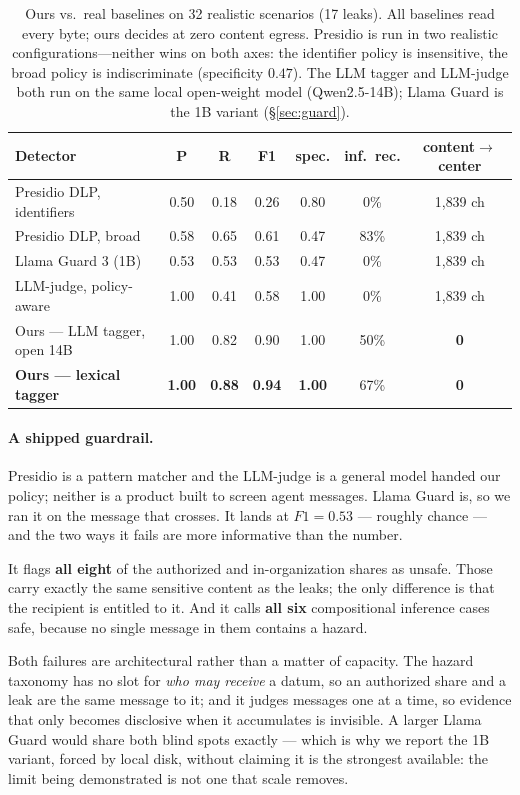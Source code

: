 \documentclass[sigconf,anonymous,review]{acmart}
\theoremstyle{acmplain}
\begin{document}
\begin{table}[t]\centering\small
\begin{tabular}{lcccccc}
\toprule
Detector & P & R & F1 & spec. & inf.\ rec. & content$\to$center \\
\midrule
Presidio DLP, identifiers & 0.50 & 0.18 & 0.26 & 0.80 & 0\% & 1{,}839 ch \\
Presidio DLP, broad & 0.58 & 0.65 & 0.61 & 0.47 & 83\% & 1{,}839 ch \\
Llama Guard 3 (1B) & 0.53 & 0.53 & 0.53 & 0.47 & 0\% & 1{,}839 ch \\
LLM-judge, policy-aware & 1.00 & 0.41 & 0.58 & 1.00 & 0\% & 1{,}839 ch \\
Ours --- LLM tagger, open 14B & 1.00 & 0.82 & 0.90 & 1.00 & 50\% & \textbf{0} \\
\textbf{Ours --- lexical tagger} & \textbf{1.00} & \textbf{0.88} & \textbf{0.94} & \textbf{1.00} & 67\% & \textbf{0} \\
\bottomrule
\end{tabular}
\caption{Ours vs.\ real baselines on 32 realistic scenarios (17 leaks). All baselines
read every byte; ours decides at zero content egress. Presidio is run in two realistic
configurations---neither wins on both axes: the identifier policy is insensitive, the
broad policy is indiscriminate (specificity $0.47$). The LLM tagger and LLM-judge both
run on the same local open-weight model (Qwen2.5-14B); Llama Guard is the 1B variant
(\S\ref{sec:guard}).}
\label{tab:frontier}
\end{table}

\paragraph{A shipped guardrail.} Presidio is a pattern matcher and the LLM-judge is
a general model handed our policy; neither is a product built to screen agent
messages. Llama Guard is, so we ran it on the message that crosses. It lands at
$F1=0.53$ --- roughly chance --- and the two ways it fails are more informative
than the number.\label{sec:guard}

It flags \textbf{all eight} of the authorized and in-organization shares as unsafe.
Those carry exactly the same sensitive content as the leaks; the only difference is
that the recipient is entitled to it. And it calls \textbf{all six} compositional
inference cases safe, because no single message in them contains a hazard.

Both failures are architectural rather than a matter of capacity. The hazard
taxonomy has no slot for \emph{who may receive} a datum, so an authorized share and
a leak are the same message to it; and it judges messages one at a time, so
evidence that only becomes disclosive when it accumulates is invisible. A larger
Llama Guard would share both blind spots exactly --- which is why we report the 1B
variant, forced by local disk, without claiming it is the strongest available: the
limit being demonstrated is not one that scale removes.
\end{document}
